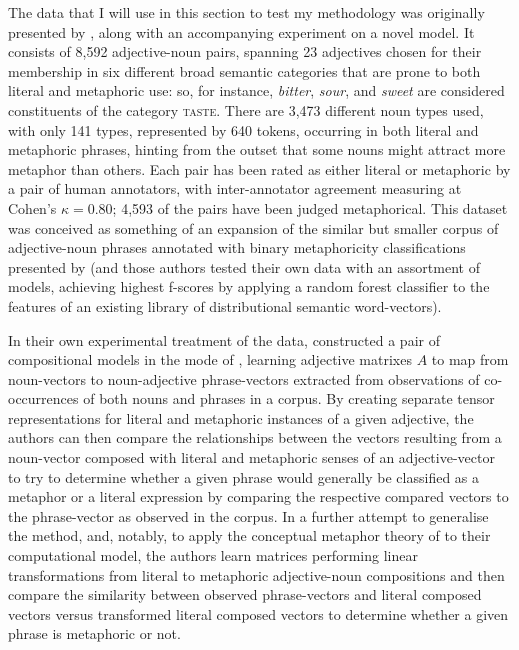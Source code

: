 The data that I will use in this section to test my methodology was originally presented by \cite{GutierrezEA2016}, along with an accompanying experiment on a novel model.  It consists of 8,592 adjective-noun pairs, spanning 23 adjectives chosen for their membership in six different broad semantic categories that are prone to both literal and metaphoric use: so, for instance, \emph{bitter}, \emph{sour}, and \emph{sweet} are considered constituents of the category \textsc{taste}.  There are 3,473 different noun types used, with only 141 types, represented by 640 tokens, occurring in both literal and metaphoric phrases, hinting from the outset that some nouns might attract more metaphor than others.  Each pair has been rated as either literal or metaphoric by a pair of human annotators, with inter-annotator agreement measuring at Cohen's $\kappa = 0.80$; 4,593 of the pairs have been judged metaphorical.  This dataset was conceived as something of an expansion of the similar but smaller corpus of adjective-noun phrases annotated with binary metaphoricity classifications presented by \cite{TsvetkovEA2014} (and those authors tested their own data with an assortment of models, achieving highest f-scores by applying a random forest classifier to the features of an existing library of distributional semantic word-vectors).

In their own experimental treatment of the data, \citeauthor{GutierrezEA2016} constructed a pair of compositional models in the mode of \cite{BaroniEA2010}, learning adjective matrixes $A$ to map from noun-vectors to noun-adjective phrase-vectors extracted from observations of co-occurrences of both nouns and phrases in a corpus.  By creating separate tensor representations for literal and metaphoric instances of a given adjective, the authors can then compare the relationships between the vectors resulting from a noun-vector composed with literal and metaphoric senses of an adjective-vector to try to determine whether a given phrase would generally be classified as a metaphor or a literal expression by comparing the respective compared vectors to the phrase-vector as observed in the corpus.  In a further attempt to generalise the method, and, notably, to apply the conceptual metaphor theory of \cite{LakoffEA1980} to their computational model, the authors learn matrices performing linear transformations from literal to metaphoric adjective-noun compositions and then compare the similarity between observed phrase-vectors and literal composed vectors versus transformed literal composed vectors to determine whether a given phrase is metaphoric or not.

